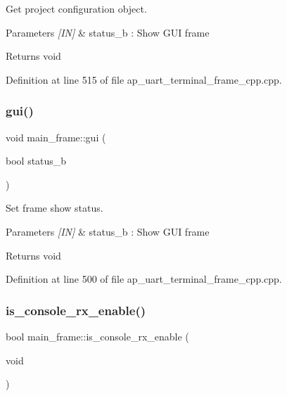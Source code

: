 Get project configuration object. 


\begin{DoxyParams}{Parameters}
{\em \mbox{[}\+I\+N\mbox{]}} & status\+\_\+b \+: Show G\+UI frame \\
\hline
\end{DoxyParams}
\begin{DoxyReturn}{Returns}
void 
\end{DoxyReturn}


Definition at line 515 of file ap\+\_\+uart\+\_\+terminal\+\_\+frame\+\_\+cpp.\+cpp.

\mbox{\label{group___u_a_r_t__terminal_ga52c3c63de414abb31fe99589d30fbdec}} 
\subsubsection{gui()}
{\footnotesize\ttfamily void main\+\_\+frame\+::gui (\begin{DoxyParamCaption}\item[{bool}]{status\+\_\+b }\end{DoxyParamCaption})}



Set frame show status. 


\begin{DoxyParams}{Parameters}
{\em \mbox{[}\+I\+N\mbox{]}} & status\+\_\+b \+: Show G\+UI frame \\
\hline
\end{DoxyParams}
\begin{DoxyReturn}{Returns}
void 
\end{DoxyReturn}


Definition at line 500 of file ap\+\_\+uart\+\_\+terminal\+\_\+frame\+\_\+cpp.\+cpp.

\mbox{\label{group___u_a_r_t__terminal_ga9979754319f812a95a8e828d305aa011}} 
\subsubsection{is\_console\_rx\_enable()}
{\footnotesize\ttfamily bool main\+\_\+frame\+::is\+\_\+console\+\_\+rx\+\_\+enable (\begin{DoxyParamCaption}\item[{void}]{ }\end{DoxyParamCaption})}



